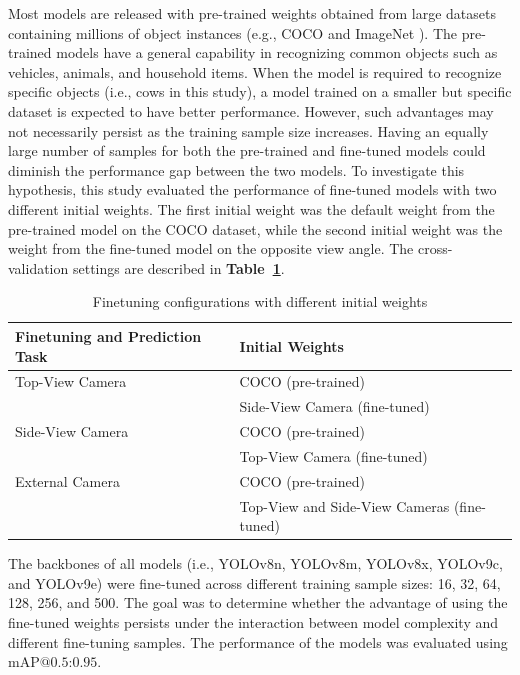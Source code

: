 Most models are released with pre-trained weights obtained from large datasets containing millions of object instances (e.g., COCO \cite{lin2014microsoft} and ImageNet \cite{deng2009imagenet}). The pre-trained models have a general capability in recognizing common objects such as vehicles, animals, and household items. When the model is required to recognize specific objects (i.e., cows in this study), a model trained on a smaller but specific dataset is expected to have better performance. However, such advantages may not necessarily persist as the training sample size increases. Having an equally large number of samples for both the pre-trained and fine-tuned models could diminish the performance gap between the two models. To investigate this hypothesis, this study evaluated the performance of fine-tuned models with two different initial weights. The first initial weight was the default weight from the pre-trained model on the COCO dataset, while the second initial weight was the weight from the fine-tuned model on the opposite view angle. The cross-validation settings are described in \textbf{Table~\ref{tab:configuration}}.

\begin{table}[h]
    \centering
    \begin{tabular}{ll}
        \toprule
        \textbf{Finetuning and Prediction Task} & \textbf{Initial Weights} \\
        \midrule
        Top-View Camera & COCO (pre-trained) \\
        & Side-View Camera (fine-tuned) \\
        \midrule
        Side-View Camera & COCO (pre-trained) \\
        & Top-View Camera (fine-tuned) \\
        \midrule
        External Camera & COCO (pre-trained) \\
        & Top-View and Side-View Cameras (fine-tuned) \\
        \bottomrule
    \end{tabular}
    \vspace{3mm}
    \caption{Finetuning configurations with different initial weights}
    \label{tab:configuration}
\end{table}

The backbones of all models (i.e., YOLOv8n, YOLOv8m, YOLOv8x, YOLOv9c, and YOLOv9e) were fine-tuned across different training sample sizes: 16, 32, 64, 128, 256, and 500. The goal was to determine whether the advantage of using the fine-tuned weights persists under the interaction between model complexity and different fine-tuning samples. The performance of the models was evaluated using $\text{mAP@{0.5:0.95}}$.



